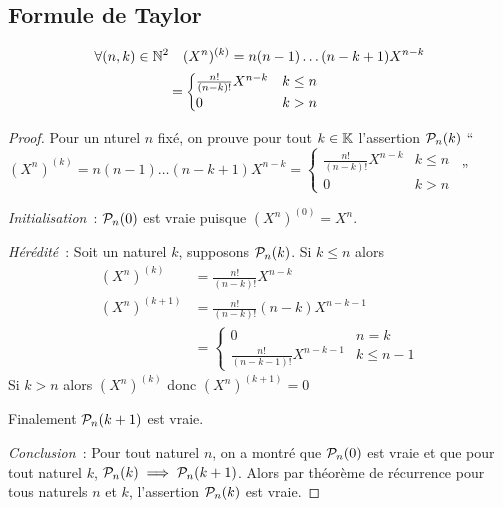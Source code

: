 \subsection{Formule de Taylor}

\begin{lemme}
  \begin{align}
    \forall (n,k) \in \N^2 \quad &(X^n)^{(k)} = n(n-1) \ldots (n-k+1) X^{n-k}\\
    = &\begin{cases}
      \frac{n!}{(n-k)!} X^{n-k} & k \leq n \\
      0 & k > n
    \end{cases}
  \end{align}
\end{lemme}
\begin{proof}
  Pour un nturel $n$ fixé, on prouve pour tout $k \in \K$ l'assertion $\P_n(k)$ ``$(X^n)^{(k)} = n(n-1) \ldots (n-k+1) X^{n-k}=
    \begin{cases}
      \frac{n!}{(n-k)!} X^{n-k} & k \leq n \\
      0 & k > n
    \end{cases}$~''

    \emph{Initialisation}~: $\P_n(0)$ est vraie puisque $(X^n)^{(0)} = X^n$.

    \emph{Hérédité}~: Soit un naturel $k$, supposons $\P_n(k)$. Si $k \leq n$ alors
    \begin{align}
      (X^n)^{(k)} &= \frac{n!}{(n-k)!} X^{n-k} \\
      (X^n)^{(k+1)} &= \frac{n!}{(n-k)!} (n-k) X^{n-k-1} \\
      &=\begin{cases} 0 & n=k \\ \frac{n!}{(n-k-1)!} X^{n-k-1} & k \leq n-1 \end{cases}
    \end{align}
    Si $k > n$ alors $(X^n)^{(k)}$ donc $(X^n)^{(k+1)}=0$

    Finalement $\P_n(k+1)$ est vraie.

    \emph{Conclusion}~: Pour tout naturel $n$, on a montré que $\P_n(0)$ est vraie et que pour tout naturel $k$, $\P_n(k) \implies \P_n(k+1)$. Alors par théorème de récurrence pour tous naturels $n$ et $k$, l'assertion $\P_n(k)$ est vraie.
\end{proof}

